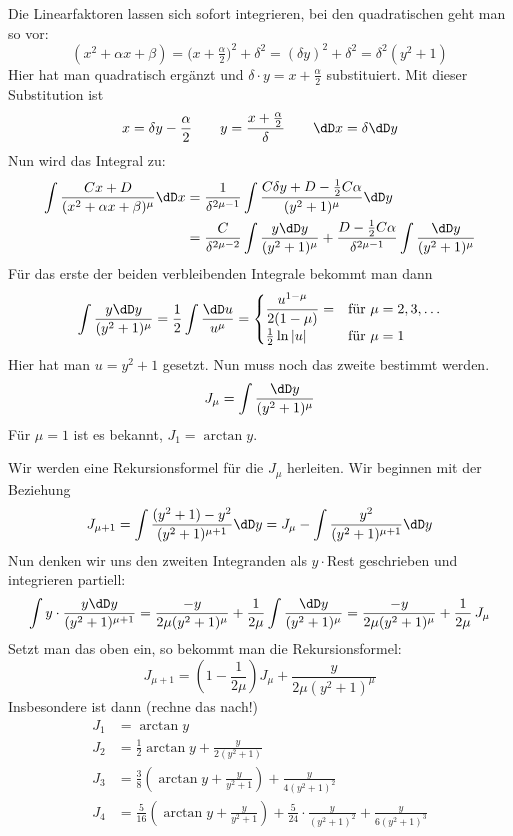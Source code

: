 \noindent Die Linearfaktoren lassen sich sofort integrieren, bei den
quadratischen geht man so vor:
\[
(x^2+\alpha x+\beta)=\bigl(x+\tfrac{\alpha}{2}\bigr)^2+\delta^2
=(\delta y)^2+\delta^2=\delta^2(y^2+1)
\]
Hier hat man quadratisch ergänzt und $\delta\cdot y=x+\frac{\alpha}{2}$
substituiert. Mit dieser Substitution ist
\[
x=\delta y-\frac{\alpha}{2}\qquad y=\frac{x+\frac{\alpha}{2}}{\delta}\qquad
\dD x=\delta\dD y
\]
Nun wird das Integral zu:
\begin{align*}
  \int\frac{Cx+D}{(x^2+\alpha x+\beta)^\mu}\dD x
  &=\frac{1}{\delta^{2\mu-1}}
  \int\frac{C\delta y+D-\frac12C\alpha}{(y^2+1)^\mu}\dD y\\
  &=\frac{C}{\delta^{2\mu-2}}\int\frac{y\dD y}{(y^2+1)^\mu}
  +\frac{D-\frac12C\alpha}{\delta^{2\mu-1}}\int\frac{\dD y}{(y^2+1)^\mu}
\end{align*}
Für das erste der beiden verbleibenden Integrale bekommt man dann
\begin{equation}
  \label{eq:70}
  \int\frac{y\dD y}{(y^2+1)^\mu}=\frac12\int\frac{\dD u}{u^\mu}=
  \begin{cases}
    \dfrac{u^{1-\mu}}{2(1-\mu)}=&\text{für~}\mu=2, 3, \dots\\
    \frac{1}{2}\ln|u|& \text{für~} \mu=1
  \end{cases}
\end{equation}
Hier hat man $u=y^2+1$ gesetzt. Nun muss noch das zweite bestimmt werden.
\[
J_\mu=\int\frac{\dD y}{(y^2+1)^\mu}
\]
Für $\mu=1$ ist es bekannt, $J_1=\arctan y$.

Wir werden eine Rekursionsformel für die $J_\mu$ herleiten. Wir beginnen mit
der Beziehung
\[
J_{\mu+1}=\int\frac{(y^2+1)-y^2}{(y^2+1)^{\mu+1}}\dD y
=J_\mu-\int\frac{y^2}{(y^2+1)^{\mu+1}}\dD y
\]
Nun denken wir uns den zweiten Integranden als $y\cdot$Rest geschrieben und
integrieren partiell:
\[
\int y\cdot\frac{y\dD y}{(y^2+1)^{\mu+1}}=
\frac{-y}{2\mu(y^2+1)^\mu}+\frac{1}{2\mu}\int\frac{\dD y}{(y^2+1)^\mu}=
\frac{-y}{2\mu(y^2+1)^\mu}+\frac{1}{2\mu}\,J_\mu
\]
Setzt man das oben ein, so bekommt man die Rekursionsformel:
\begin{equation}
  \label{eq:71}
  J_{\mu+1}=\left(1-\frac{1}{2\mu}\right)J_\mu+\frac{y}{2\mu(y^2+1)^\mu}
\end{equation}
Insbesondere ist dann (rechne das nach!)
\begin{align*}
  J_1&=\arctan y\\
  J_2&=\frac{1}{2}\arctan y+\frac{y}{2(y^2+1)}\\
  J_3&=\frac38\left(\arctan y+\frac{y}{y^2+1}\right)+\frac{y}{4(y^2+1)^2}\\
  J_4&=\frac{5}{16}\left(\arctan y+\frac{y}{y^2+1}\right)+
       \frac{5}{24}\cdot\frac{y}{(y^2+1)^2}+\frac{y}{6(y^2+1)^3}
\end{align*}
